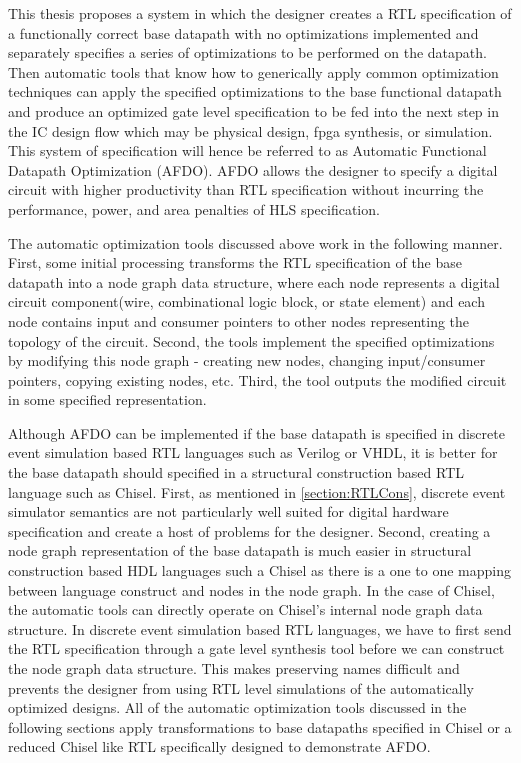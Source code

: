 This thesis proposes a system in which the designer creates a RTL specification of a functionally correct base datapath with no optimizations implemented and separately specifies a series of optimizations to be performed on the datapath. Then automatic tools that know how to generically apply common optimization techniques can apply the specified optimizations to the base functional datapath and produce an optimized gate level specification to be fed into the next step in the IC design flow which may be physical design, fpga synthesis, or simulation. This system of specification will hence be referred to as Automatic Functional Datapath Optimization (AFDO). AFDO allows the designer to specify a digital circuit with higher productivity than RTL specification without incurring the performance, power, and area penalties of HLS specification.

The automatic optimization tools discussed above work in the following manner. First, some initial processing transforms the RTL specification of the base datapath into a node graph data structure, where each node represents a digital circuit component(wire, combinational logic block, or state element) and each node contains input and consumer pointers to other nodes representing the topology of the circuit. Second, the tools implement the specified optimizations by modifying this node graph - creating new nodes, changing input/consumer pointers, copying existing nodes, etc. Third, the tool outputs the modified circuit in some specified representation.

Although AFDO can be implemented if the base datapath is specified in discrete event simulation based RTL languages such as Verilog or VHDL, it is better for the base datapath should specified in a structural construction based RTL language such as Chisel. First, as mentioned in \ref{section:RTLCons}, discrete event simulator semantics are not particularly well suited for digital hardware specification and create a host of problems for the designer. Second, creating a node graph representation of the base datapath is much easier in structural construction based HDL languages such a Chisel as there is a one to one mapping between language construct and nodes in the node graph. In the case of Chisel, the automatic tools can directly operate on Chisel’s internal node graph data structure. In discrete event simulation based RTL languages, we have to first send the RTL specification through a gate level synthesis tool before we can construct the node graph data structure. This makes preserving names difficult and prevents the designer from using RTL level simulations of the automatically optimized designs. All of the automatic optimization tools discussed in the following sections apply transformations to base datapaths specified in Chisel or a reduced Chisel like RTL specifically designed to demonstrate AFDO.

